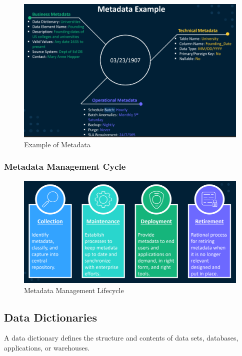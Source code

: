 \begin{figure}[H]
    \centering
    \includegraphics[scale=0.60]{images/Metadata Example.png}
    \caption{Example of Metadata}
    \label{Metadata Example}
\end{figure}

\subsubsection{Metadata Management Cycle}

\begin{figure}[H]
    \centering
    \includegraphics[scale=0.58]{images/Metadata Management Lifecycle.png}
    \caption{Metadata Management Lifecycle}
    \label{Metadata Management Lifecycle}
\end{figure}

\subsection{Data Dictionaries}
A data dictionary defines the structure and contents of data sets, databases, applications, or warehouses.

